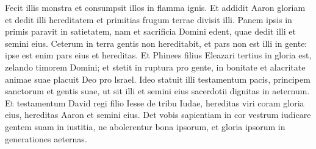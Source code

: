 \begin{biblechapter}
\verse Fecit illis monstra et consumpsit illos in flamma ignis. 
\verse Et addidit Aaron gloriam et dedit illi hereditatem et primitias frugum terrae divisit illi. 
\verse Panem ipsis in primis paravit in satietatem, nam et sacrificia Domini edent, quae dedit illi et semini eius. 
\verse Ceterum in terra gentis non hereditabit, et pars non est illi in gente: ipse est enim pars eius et hereditas. 
\verse Et Phinees filius Eleazari tertius in gloria est, zelando timorem Domini; 
\verse et stetit in ruptura pro gente, in bonitate et alacritate animae suae placuit Deo pro lsrael. 
\verse Ideo statuit illi testamentum pacis, principem sanctorum et gentis suae, ut sit illi et semini eius sacerdotii dignitas in aeternum. 
\verse Et testamentum David regi filio Iesse de tribu Iudae, hereditas viri coram gloria eius, hereditas Aaron et semini eius. Det vobis sapientiam in cor vestrum iudicare gentem suam in iustitia, ne abolerentur bona ipsorum, et gloria ipsorum in generationes aeternas. 
\end{biblechapter}

